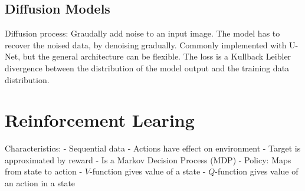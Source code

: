 \documentclass{scrartcl}
\begin{document}
\subsection*{Diffusion Models}
Diffusion process: Graudally add noise to an input image. The model has to recover the noised data, by denoising gradually. Commonly implemented with U-Net, but the general architecture can be flexible.
The loss is a Kullback Leibler divergence between the distribution of the model output and the training data distribution.


\section*{Reinforcement Learing}
Characteristics:
- Sequential data
- Actions have effect on environment
- Target is approximated by reward
- Is a Markov Decision Process (MDP)
- Policy: Maps from state to action
- $V$-function gives value of a state
- $Q$-function gives value of an action in a state
\end{document}
